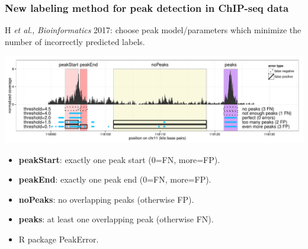 \documentclass{beamer}
\begin{document}
\begin{frame}
  \frametitle{New labeling method for peak detection in ChIP-seq data}

  H {\it et al.}, {\it Bioinformatics} 2017: choose peak model/parameters
  which minimize the number of incorrectly predicted labels.

  \includegraphics[width=\textwidth]{figure-PeakError.pdf}
  \begin{itemize}
  \item \textbf{peakStart}: exactly one peak start (0=FN, more=FP).
  \item \textbf{peakEnd}: exactly one peak end (0=FN, more=FP).
  \item \textbf{noPeaks}: no overlapping peaks (otherwise FP).
  \item \textbf{peaks}: at least one overlapping peak (otherwise FN).
  \item R package PeakError.
  \end{itemize}
\end{frame}



\end{document}
